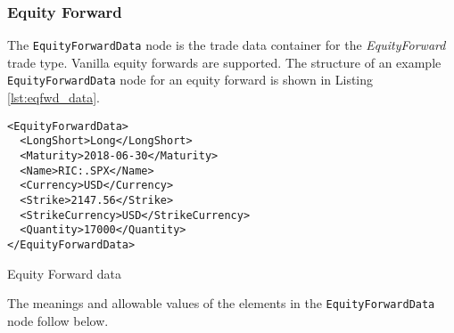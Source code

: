 \subsubsection{Equity Forward}

The \lstinline!EquityForwardData!  node is the trade data container for the \emph{EquityForward} trade type.  Vanilla equity 
forwards are supported. The structure of an example \lstinline!EquityForwardData! node for an equity forward is shown in 
Listing \ref{lst:eqfwd_data}.

\begin{listing}[H]
\begin{verbatim}
<EquityForwardData>
  <LongShort>Long</LongShort>
  <Maturity>2018-06-30</Maturity>
  <Name>RIC:.SPX</Name>
  <Currency>USD</Currency>
  <Strike>2147.56</Strike>
  <StrikeCurrency>USD</StrikeCurrency>
  <Quantity>17000</Quantity>
</EquityForwardData>
\end{verbatim}
\caption{Equity Forward data}
\label{lst:eqfwd_data}
\end{listing}

The meanings and allowable values of the elements in the \lstinline!EquityForwardData!  node follow below.

